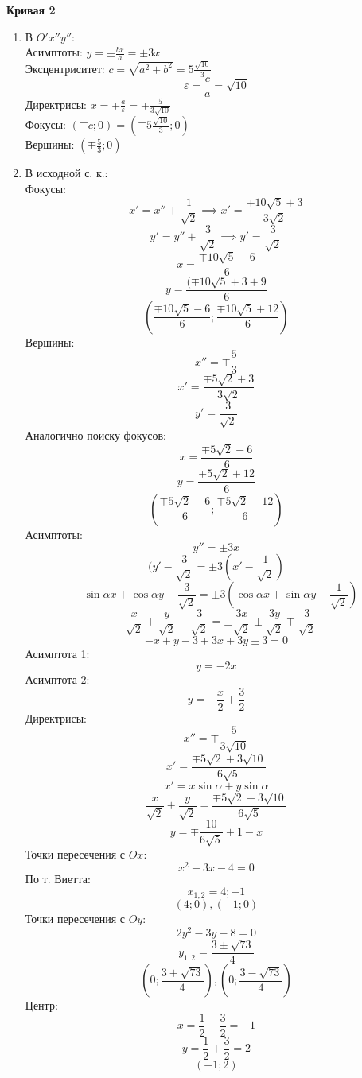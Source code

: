 \documentclass{article}
\theoremstyle{plain}
\begin{document}
\begin{enumerate}
\begin{enumerate}
    \end{enumerate}
    \textbf{Кривая 2}
    \begin{enumerate}
        \item В $O'x''y''$:\\
        Асимптоты: $y = \pm \frac{bx}{a} = \pm 3x$\\
        \vspace{2mm}
        Эксцентриситет: $c = \sqrt{a^2 + b^2} = 5\frac{\sqrt{10}}{3}$
        $$\varepsilon = \frac{c}{a} = \sqrt{10}$$
        \vspace{2mm}
        Директрисы: $x = \mp \frac{a}{\varepsilon} = \mp \frac{5}{3\sqrt{10}}$\\
        \vspace{2mm}
        Фокусы: $(\mp c; 0) = (\mp 5\frac{\sqrt{10}}{3}; 0)$\\
        \vspace{2mm}
        Вершины: $(\mp \frac{5}{3}; 0)$\\
        \item В исходной с. к.:\\
        Фокусы:
        $$x' = x'' + \frac{1}{\sqrt{2}} \implies x' = \frac{\mp 10\sqrt{5} + 3}{3\sqrt{2}}$$
        $$y' = y'' + \frac{3}{\sqrt{2}} \implies y' = \frac{3}{\sqrt{2}}$$
        $$ x = \frac{\mp 10\sqrt{5} - 6}{6} $$
        $$y = \frac{(\mp 10\sqrt{5} + 3 + 9}{6}$$
        $$(\frac{\mp10\sqrt{5} - 6}{6}; \frac{\mp 10\sqrt{5} + 12}{6})$$
        Вершины:
        $$ x'' = \mp \frac{5}{3}$$
        $$ x' = \frac{\mp5\sqrt{2} + 3}{3\sqrt{2}}$$
        $$y' = \frac{3}{\sqrt{2}}$$
        Аналогично поиску фокусов:
        $$x = \frac{\mp5\sqrt{2} - 6}{6}$$
        $$y = \frac{\mp 5\sqrt{2} + 12}{6}$$
        $$( \frac{\mp5\sqrt{2} - 6}{6}; \frac{\mp 5\sqrt{2} + 12}{6})$$
        Асимптоты:
        $$y'' = \pm 3x$$
        $$(y' - \frac{3}{\sqrt{2}} = \pm 3(x' - \frac{1}{\sqrt{2}})$$
        $$-\sin{\alpha}x + \cos{\alpha}y - \frac{3}{\sqrt{2}} = \pm 3( \cos{\alpha}x + \sin{\alpha}y - \frac{1}{\sqrt{2}})$$
        $$-\frac{x}{\sqrt{2}} + \frac{y}{\sqrt{2}} - \frac{3}{\sqrt{2}} = \pm \frac{3x}{\sqrt{2}} \pm \frac{3y}{\sqrt{2}} \mp \frac{3}{\sqrt{2}}$$
        $$ -x + y - 3 \mp 3x \mp 3y \pm 3 = 0$$
        Асимптота 1:
        $$y = -2x$$
        Асимптота 2:
        $$ y = -\frac{x}{2} + \frac{3}{2} $$
        Директрисы:
        $$ x'' = \mp \frac{5}{3\sqrt{10}} $$
        $$x' = \frac{\mp 5\sqrt{2} + 3\sqrt{10}}{6\sqrt{5}}$$
        $$x' = x\sin{\alpha} + y\sin{\alpha}$$
        $$\frac{x}{\sqrt{2}} + \frac{y}{\sqrt{2}} = \frac{\mp 5\sqrt{2} + 3\sqrt{10}}{6\sqrt{5}}$$
        $$y = \mp \frac{10}{6\sqrt{5}} + 1 - x$$
        Точки пересечения с $Ox$:
        $$ x^2 - 3x - 4 = 0$$
        По т. Виетта:
        $$x_{1, 2} = 4; -1$$
        $$(4; 0), (-1; 0) $$
        Точки пересечения с $Oy$:
        $$ 2y^2 - 3y - 8 = 0$$
        $$y_{1, 2} = \frac{3 \pm \sqrt{73}}{4}$$ 
        $$(0; \frac{3 + \sqrt{73}}{4}), (0; \frac{3 - \sqrt{73}}{4})  $$
        Центр: 
        $$ x = \frac{1}{2} - \frac{3}{2} = -1$$
        $$y = \frac{1}{2} + \frac{3}{2} = 2$$
        $$(-1; 2)$$
    \end{enumerate}
    
\end{enumerate}
\newpage
\end{document}

